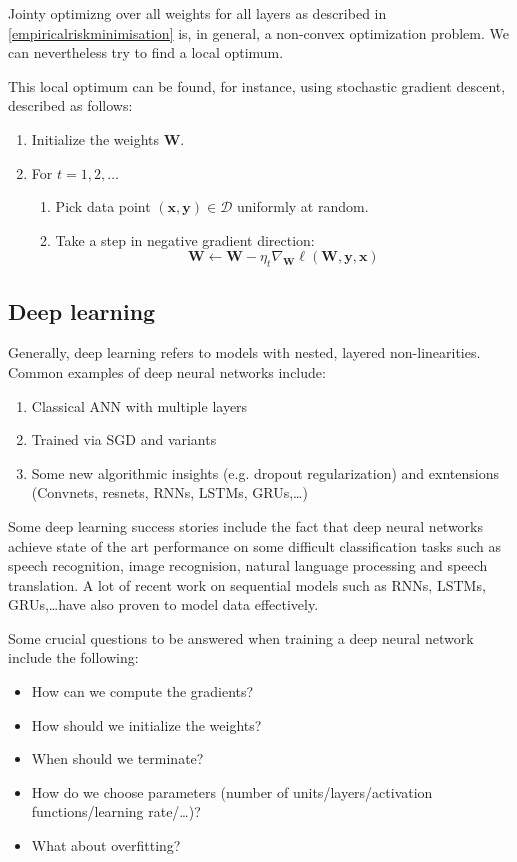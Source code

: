 \documentclass[a4paper,10pt,twoside]{article}
\newlength{\drop}
\begin{document}
Jointy optimizng over all weights for all layers as described in \ref{empiricalriskminimisation} is, in general, a non-convex optimization problem. We can nevertheless try to find a local optimum.

This local optimum can be found, for instance, using stochastic gradient descent, described as follows:
\begin{enumerate}
    \item Initialize the weights $\mathbf{W}$.
    \item For $t=1,2,\ldots$
    \begin{enumerate}
        \item Pick data point $(\mathbf{x}, \mathbf{y})\in\mathcal{D}$ uniformly at random.
        \item Take a step in negative gradient direction:
        \begin{equation*}
            \mathbf{W}\leftarrow \mathbf{W}-\eta_t\nabla_{\mathbf{W}}\ell(\mathbf{W},\mathbf{y},\mathbf{x})
        \end{equation*}
    \end{enumerate}
\end{enumerate}

\subsection{Deep learning}

Generally, deep learning refers to models with nested, layered non-linearities. Common examples of deep neural networks include:
\begin{enumerate}
    \item Classical ANN with multiple layers
    \item Trained via SGD and variants
    \item Some new algorithmic insights (e.g. dropout regularization) and exntensions (Convnets, resnets, RNNs, LSTMs, GRUs,\dots)
\end{enumerate}
Some deep learning success stories include the fact that deep neural networks achieve state of the art performance on some difficult classification tasks such as speech recognition, image recognision, natural language processing and speech translation. A lot of recent work on sequential models such as RNNs, LSTMs, GRUs,\dots have also proven to model data effectively.

Some crucial questions to be answered when training a deep neural network include the following:

\begin{itemize}
    \item How can we compute the gradients?
    \item How should we initialize the weights?
    \item When should we terminate?
    \item How do we choose parameters (number of units/layers/activation functions/learning rate/\dots)?
    \item What about overfitting?
\end{itemize}
\end{document}

